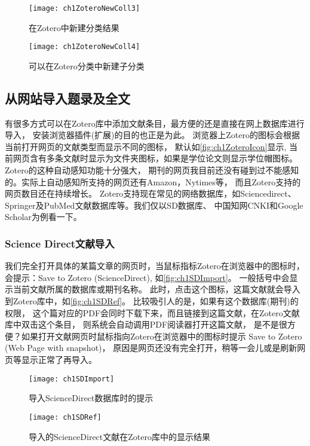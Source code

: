 \documentclass[cn,11pt,chinese]{elegantbook}
\begin{document}
\begin{enumerate}
		\begin{figure}[htbp]
			\begin{minipage}[t]{0.4\linewidth}
				\centering
				\texttt{[image: ch1ZoteroNewColl3]}
				\caption{在Zotero中新建分类结果}
				\label{fig:ch1ZoteroNewColl3}
			\end{minipage}
			\begin{minipage}[t]{0.7\linewidth}
				\centering
				\texttt{[image: ch1ZoteroNewColl4]}
				\caption{可以在Zotero分类中新建子分类}
				\label{fig:ch1ZoteroNewColl4}
			\end{minipage}
		\end{figure}
	\end{enumerate}
	\subsection{从网站导入题录及全文} \label{sec:ImportFromWeb}
	有很多方式可以在Zotero库中添加文献条目，最方便的还是直接在网上数据库进行导入，
	安装浏览器插件(扩展)的目的也正是为此。
	浏览器上Zotero的图标会根据当前打开网页的文献类型而显示不同的图标，
	默认如\autoref{fig:ch1ZoteroIcon}显示,
	当前网页含有多条文献时显示为文件夹图标，如果是学位论文则显示学位帽图标。
	Zotero的这种自动感知功能十分强大，
	期刊的网页我目前还没有碰到过不能感知的。实际上自动感知所支持的网页还有Amazon，Nytimes等，
	而且Zotero支持的网页数目还在持续增长。
	Zotero支持现在常见的网络数据库，如Sciencedirect、Springer及PubMed文献数据库等。我们仅以SD数据库、
	中国知网CNKI和Google Scholar为例看一下。
	\subsubsection{Science Direct文献导入}
	我们完全打开具体的某篇文章的网页时，当鼠标指标Zotero在浏览器中的图标时，
	会提示：Save to Zotero (ScienceDirect), 如\autoref{fig:ch1SDImport}。
	一般括号中会显示当前文献所属的数据库或期刊名称。
	此时，点击这个图标，这篇文献就会导入到Zotero库中，如\autoref{fig:ch1SDRef}。
	比较吸引人的是，如果有这个数据库(期刊)的权限，
	这个篇对应的PDF会同时下载下来，而且链接到这篇文献，在Zotero文献库中双击这个条目，
	则系统会自动调用PDF阅读器打开这篇文献，
	是不是很方便？如果打开文献网页时鼠标指向Zotero在浏览器中的图标时提示
	Save to Zotero (Web Page with snapshot)，
	原因是网页还没有完全打开，稍等一会儿或是刷新网页等显示正常了再导入。
	\begin{figure}[htbp]
		\centering
		\texttt{[image: ch1SDImport]}
		\caption{导入ScienceDirect数据库时的提示}
		\label{fig:ch1SDImport}
	\end{figure}
	\begin{figure}
		\centering
		\texttt{[image: ch1SDRef]}
		\caption{导入的ScienceDirect文献在Zotero库中的显示结果}
		\label{fig:ch1SDRef}
	\end{figure}
\end{document}
